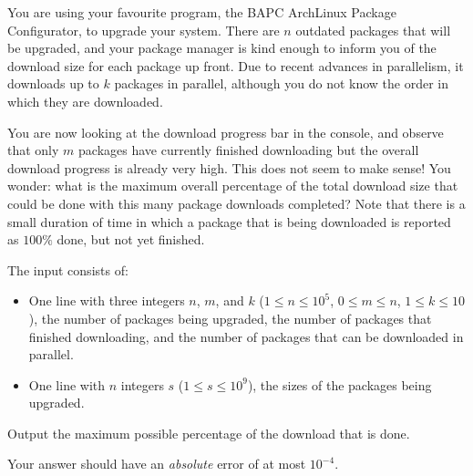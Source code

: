 

\newcommand{\maxn}{10^5}
\newcommand{\maxs}{10^9}

You are using your favourite program, the BAPC ArchLinux Package Configurator, to upgrade your
system. There are $n$ outdated packages that will be upgraded, and your package
manager is kind enough to inform you of the download size for each package up front.
Due to recent advances in parallelism, it downloads up to $k$ packages in
parallel, although you do not know the order in which they are downloaded.

You are now looking at the download progress bar in the console, and observe that
only $m$ packages have currently finished downloading but the overall download progress
is already very high. This does not seem to make sense! You wonder: what is the maximum overall percentage
of the total download size that could be done with this many package downloads completed?
Note that there is a small duration of
time in which a package that is being downloaded is reported as $100\%$ done, but not
yet finished.

\begin{Input}
    The input consists of:
    \begin{itemize}
        \item One line with three integers $n$, $m$, and $k$ ($1\leq n\leq \maxn$, $0\leq m\leq n$, $1\leq k\leq 10$),
            the number of packages being upgraded,
            the number of packages that finished downloading, and
            the number of packages that can be downloaded in parallel.
        \item One line with $n$ integers $s$ ($1\leq s\leq \maxs$), the sizes of the packages being upgraded.
    \end{itemize}
\end{Input}

\begin{Output}
    Output the maximum possible percentage of the download that is done.

    Your answer should have an \emph{absolute} error of at most $10^{-4}$.
\end{Output}
